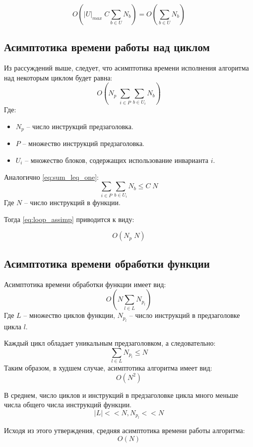 $$ O(|U|_{max} \; C \sum_{b \in U} N_b) = O(\sum_{b \in U} N_b) $$

\subsection{Асимптотика времени работы над циклом}

Из рассуждений выше, следует, что асимптотика времени исполнения алгоритма над некоторым циклом будет равна:
\begin{equation} \label{eq:loop_assimp}
O(N_p \; \sum_{i \in P} {\sum_{b \in U_i} N_b})
\end{equation}
Где:
\begin{itemize}
    \item $N_p$ -- число инструкций предзаголовка.
    \item $P$ -- множество инструкций предзаголовка.
    \item $U_i$ -- множество блоков, содержащих использование инварианта $i$.
\end{itemize}

Аналогично \ref{eq:sum_leq_one}:
$$ \sum_{i \in P} {\sum_{b \in U_i} N_b} \leq C \; N $$
Где $N$ -- число инструкций в функции.

Тогда \ref{eq:loop_assimp} приводится к виду:

$$ O(N_p \; N) $$

\subsection{Асимптотика времени обработки функции}

Асимптотика времени обработки функции имеет вид:
\begin{equation} \label{eq:assimp}
O(N \sum_{l \in L} N_{p_l})
\end{equation}
Где $L$ -- множество циклов функции, $N_{p_l}$ -- число инструкций в предзаголовке цикла $l$.

Каждый цикл обладает уникальным предзаголовком, а следовательно:
$$ \sum_{l \in L} N_{p_l} \leq N $$
Таким образом, в худшем случае, асимптотика алгоритма имеет вид:
\begin{equation} \label{eq:assimp_worst}
O(N^2)
\end{equation}

В среднем, число циклов и инструкций в предзаголовке цикла много меньше числа общего числа инструкций функции.
$$ |L| << N, N_{p_l} << N $$

Исходя из этого утверждения, средняя асимптотика времени работы алгоритма:
\begin{equation} \label{eq:assimp_avg}
O(N)
\end{equation}

